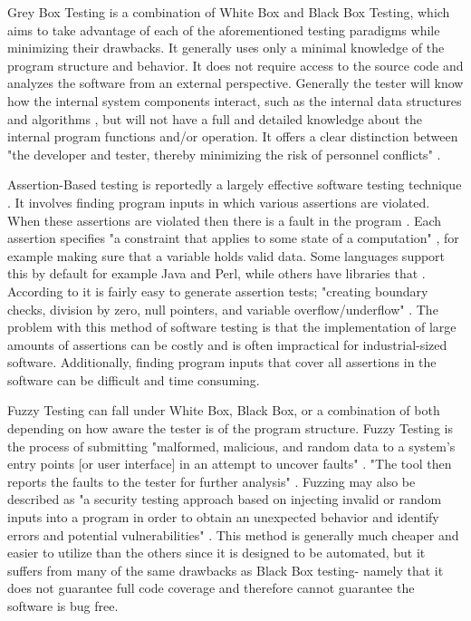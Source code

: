 \documentclass[10pt, final, journal, letterpaper, twoside, twocolumn]{IEEEtran}
\begin{document}
	Grey Box Testing is a combination of White Box and Black Box Testing, which aims to take advantage of each of the aforementioned testing paradigms while minimizing their drawbacks. It generally uses only a minimal knowledge of the program structure and behavior. It does not require access to the source code and analyzes the software from an external perspective. Generally the tester will know how the internal system components interact, such as the internal data structures and algorithms \cite{gray}, but will not have a full and detailed knowledge about the internal program functions and/or operation. It offers a clear distinction between "the developer and tester, thereby minimizing the risk of personnel conflicts" \cite{gray}. 
	
	Assertion-Based testing is reportedly a largely effective software testing technique \cite{assertion}. It involves finding program inputs in which various assertions are violated. When these assertions are violated then there is a fault in the program \cite{assertion}. Each assertion specifies "a constraint that applies to some state of a computation" \cite{assertion}, for example making sure that a variable holds valid data. Some languages support this by default for example Java and Perl, while others have libraries that . According to \cite{fuzzy-logic} it is fairly easy to generate assertion tests; "creating boundary checks, division by zero, null pointers, and variable overflow/underflow" \cite{fuzzy-logic}. The problem with this method of software testing is that the implementation of large amounts of assertions can be costly and is often impractical for industrial-sized software. Additionally, finding program inputs that cover all assertions in the software can be difficult and time consuming. 
	
	Fuzzy Testing can fall under White Box, Black Box, or a combination of both depending on how aware the tester is of the program structure. Fuzzy Testing is the process of submitting "malformed, malicious, and random data to a system's entry points [or user interface] in an attempt to uncover faults" \cite{penetration}. "The tool then reports the faults to the tester for further analysis" \cite{penetration}. Fuzzing may also be described as "a security testing approach based on injecting invalid or random inputs into a program in order to obtain an unexpected behavior and identify errors and potential vulnerabilities" \cite{vulnerabilities}. This method is generally much cheaper and easier to utilize than the others since it is designed to be automated, but it suffers from many of the same drawbacks as Black Box testing- namely that it does not guarantee full code coverage and therefore cannot guarantee the software is bug free. 
\end{document}

